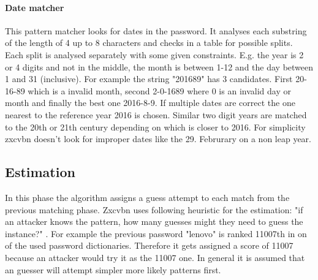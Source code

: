 \documentclass[12pt,a4paper]{article}
\begin{document}

\paragraph{Date matcher}
This pattern matcher looks for dates in the password. It analyses each substring of the length of 4 up to 8 characters and checks in a table for possible splits. Each split is analysed separately with some given constraints. E.g. the year is 2 or 4 digits and not in the middle, the month is between 1-12 and the day between 1 and 31 (inclusive). 
For example the string "201689" has 3 candidates. First 20-16-89 which is a invalid month, second 2-0-1689 where 0 is an invalid day or month and finally the best one 2016-8-9. If multiple dates are correct the one nearest to the reference year 2016 is chosen. Similar two digit years are matched to the 20th or 21th century depending on which is closer to 2016. For simplicity zxcvbn doesn't look for improper dates like the 29. Februrary on a non leap year.






\subsection{Estimation}

In this phase the algorithm assigns a guess attempt to each match from the previous matching phase.
Zxcvbn uses following heuristic for the estimation: "if an attacker knows the pattern, how many guesses might they need to guess the instance?" \cite{zxcvbn}. For example the previous password "lenovo" is ranked 11007th in on of the used password dictionaries. Therefore it gets assigned a score of 11007 because an attacker would try it as the 11007 one. In general it is assumed that an guesser will attempt simpler more likely patterns first.
\end{document}
